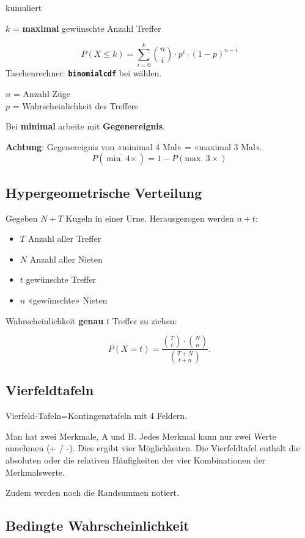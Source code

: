 \begin{multicols}{2}
\begin{gesetz*}{kumuliert}{}

$k$ = \textbf{maximal} gewünschte Anzahl Treffer


$$P(X\le k) = \sum_{i=0}^{k}{n \choose i}\cdot{}p^i\cdot{}(1-p)^{n-i}$$
Taschenrechner: \textbf{\texttt{binomialcdf}} bei  wählen.

$n$ = Anzahl Züge\\
$p$ = Wahrscheinlichkeit des Treffers\\
\end{gesetz*}
Bei \textbf{minimal} arbeite mit \textbf{Gegenereignis}.

\textbf{Achtung}: Gegenereignis von «minimal 4 Mal» = «maximal 3 Mal».
$$P(\overline{\textrm{min. 4}\times}) = 1 - P(\textrm{max. 3}\times)$$

\forceCB
\subsection*{Hypergeometrische Verteilung}
Gegeben $N+T$ Kugeln in einer Urne. Herausgezogen werden $n+t$:
\begin{itemize}
\item $T$ Anzahl aller Treffer
\item $N$ Anzahl aller Nieten
\item $t$ gewünschte Treffer
\item $n$ «gewünschte» Nieten
\end{itemize}
Wahrscheinlichkeit \textbf{genau} $t$ Treffer zu ziehen:

$$P(X=t) = \frac{ {T \choose t} \cdot {N  \choose n} }{{T+N \choose t+n}}.$$


\subsection*{Vierfeldtafeln}
Vierfeld-Tafeln=Kontingenztafeln mit 4 Feldern.

Man hat zwei Merkmale, A und B. Jedes Merkmal kann nur zwei Werte
annehmen (+ / -). Dies ergibt vier Möglichkeiten. Die Vierfeldtafel
enthält die absoluten oder die relativen Häufigkeiten der vier
Kombinationen der Merkmalswerte.

Zudem werden noch die Randsummen notiert.


\subsection*{Bedingte Wahrscheinlichkeit}


\end{multicols}
